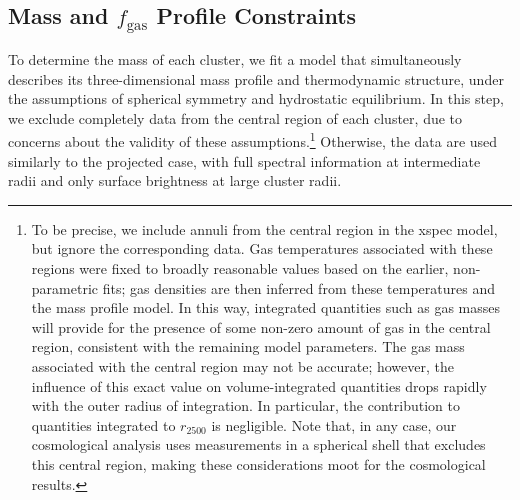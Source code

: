 \documentclass[useAMS,usenatbib,usegraphicx]{mn2e}
\newcommand*{\mysub}[2]{\ensuremath{#1_{\mathrm{#2}}}}
\newcommand*{\fgas}{\mysub{f}{gas}}
\begin{document}
\subsection{Mass and \fgas{} Profile Constraints} \label{sec:nfwfit}

To determine the mass of each cluster, we fit a model that simultaneously describes its three-dimensional mass profile and thermodynamic structure, under the assumptions of spherical symmetry and hydrostatic equilibrium. In this step, we exclude completely data from the central region of each cluster, due to concerns about the validity of these assumptions.\footnote{To be precise, we include annuli from the central region in the {\sc xspec} model, but ignore the corresponding data. Gas temperatures associated with these regions were fixed to broadly reasonable values based on the earlier, non-parametric fits; gas densities are then inferred from these temperatures and the mass profile model. In this way, integrated quantities such as gas masses will provide for the presence of some non-zero amount of gas in the central region, consistent with the remaining model parameters. The gas mass associated with the central region may not be accurate; however, the influence of this exact value on volume-integrated quantities drops rapidly with the outer radius of integration. In particular, the contribution to quantities integrated to $r_{2500}$ is negligible. Note that, in any case, our cosmological analysis uses measurements in a spherical shell that excludes this central region, making these considerations moot for the cosmological results.} Otherwise, the data are used similarly to the projected case, with full spectral information at intermediate radii and only surface brightness at large cluster radii.
\end{document}
